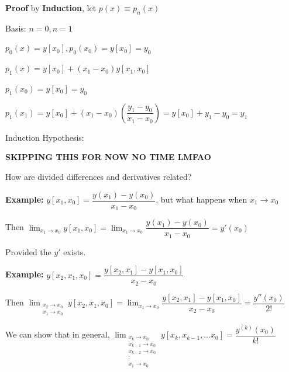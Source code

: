 \documentclass{article}
\begin{document}
\vspace{0.2cm}

\textbf{Proof} by \textbf{Induction}, let $p(x) \equiv p_n(x)$

Basis: $n = 0, n = 1$

$p_0 (x) = y[x_0], p_0(x_0) = y[x_0] = y_0$

\vspace{0.2cm}

$p_1 (x) = y[x_0] + (x_1 - x_0)y[x_1, x_0]$

\vspace{0.2cm}

$p_1(x_0) = y[x_0] = y_0$

$p_1(x_1) = y[x_0] + (x_1 - x_0) \left(\dfrac{y_1 - y_0}{x_1 - x_0 } \right) = y[x_0] + y_1 - y_0 = y_1$

\vspace{0.2cm}

Induction Hypothesis: 

\textbf{SKIPPING THIS FOR NOW NO TIME LMFAO}

\vspace{5cm} 

How are divided differences and derivatives related?

\textbf{Example:} $y[x_1 , x_0] = \dfrac{y(x_1) - y(x_0)}{x_1 - x_0}$, but what happens when $x_1 \to x_0$

\vspace{0.1cm}

Then $\displaystyle \lim_{x_1 \to x_0} y[x_1, x_0] = \lim_{x_1 \to x_0} \dfrac{y(x_1) - y(x_0)}{x_1 - x_0} = y'(x_0)$

Provided the $y'$ exists.

\textbf{Example:} $y[x_2, x_1, x_0] = \dfrac{y[x_2, x_1] - y[x_1, x_0]}{x_2 - x_0}$

\vspace{0.1cm}

Then $\displaystyle \lim_{\substack{x_2 \to x_0 \\ x_1 \to x_0 }} y[x_2, x_1, x_0] = \lim_{x_1 \to x_0} \dfrac{y[x_2, x_1] - y[x_1, x_0]}{x_2 - x_0} = \dfrac{y''(x_0)}{2!}$

\vspace{0.2cm}

We can show that in general, $\lim_{\substack{x_k \to x_0 \\ x_{k - 1} \to x_0 \\ x_{k - 2} \to x_0 \\ \vdots \\ x_1 \to x_0}} y[x_k, x_{k - 1}, \dots x_0] = \dfrac{y^{(k)} (x_0)}{k!}$
\end{document}
